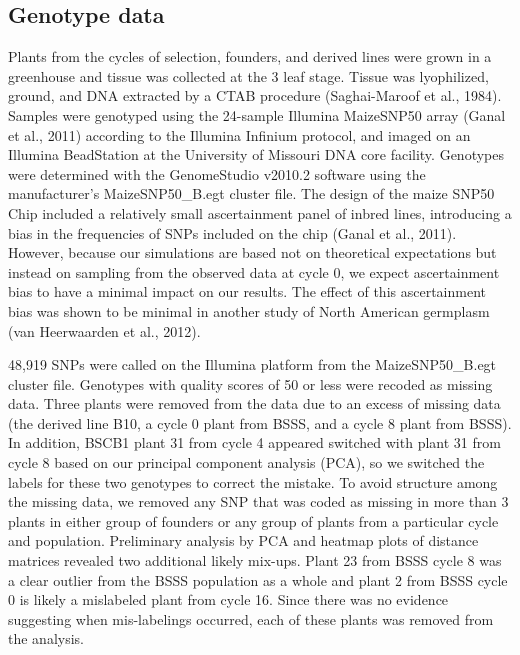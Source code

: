 \subsection*{Genotype data}
 Plants from the cycles of selection, founders, and derived lines were grown in a greenhouse and tissue was collected at the 3 leaf stage. Tissue was lyophilized, ground, and DNA extracted by a CTAB procedure (Saghai-Maroof et al., 1984). 
Samples were genotyped using the 24-sample Illumina MaizeSNP50 array (Ganal et al., 2011) according to the Illumina Infinium protocol, and imaged on an Illumina BeadStation at the University of Missouri DNA core facility. Genotypes were determined with the GenomeStudio v2010.2 software using the manufacturer's MaizeSNP50\_B.egt cluster file. 
The design of the maize SNP50 Chip included a relatively small ascertainment panel of inbred lines, introducing a bias in the frequencies of SNPs included on the chip (Ganal et al., 2011). 
However, because our simulations are based not on theoretical expectations but instead on sampling from the observed data at cycle 0, we expect ascertainment bias to have a minimal impact on our results. The effect of this ascertainment bias was shown to be minimal in another study of North American germplasm (van Heerwaarden et al., 2012). 

48,919 SNPs were called on the Illumina platform from the MaizeSNP50_B.egt cluster file. Genotypes with quality scores of 50 or less were recoded as missing data. Three plants were removed from the data due to an excess of missing data (the derived line B10, a cycle 0 plant from BSSS, and a cycle 8 plant from BSSS). 
In addition, BSCB1 plant 31 from cycle 4 appeared switched with plant 31 from cycle 8 based on our principal component analysis (PCA), so we switched the labels for these two genotypes to correct the mistake. 
To avoid structure among the missing data, we removed any SNP that was coded as missing in more than 3 plants in either group of founders or any group of plants from a particular cycle and population. Preliminary analysis by PCA and heatmap plots of distance matrices revealed two additional likely mix-ups. 
Plant 23 from BSSS cycle 8 was a clear outlier from the BSSS population as a whole and plant 2 from BSSS cycle 0 is likely a mislabeled plant from cycle 16. Since there was no evidence suggesting when mis-labelings occurred, each of these plants was removed from the analysis.
	

